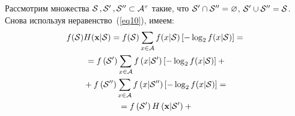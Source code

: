 \begin{multicols}{2}
Рассмотрим множества ${\cal S}\,,{\cal S}'\,,{\cal S}''\subset{\cal A}^\tau$ такие, 
что ${\cal S}'\cap{\cal S}''\hm =\varnothing$, ${\cal S}'\cup{\cal S}'' \hm={\cal S}$. 
Снова используя неравенство~(\ref{eq10}), имеем:
\begin{multline*}
f({\cal S}) H(\mathbf{x}|{\cal S}) =
f({\cal S})\sum\limits_{x\in{\cal A}} f(x|{\cal S}) 
\left[-\log_{2}f(x|{\cal S})\right] ={} \\
{}= f\left( {\cal S}'\right)\sum\limits_{x\in{\cal A}} f\left(x|{\cal S}'\right) 
\left[-\log_{2}f(x|{\cal S})\right] +{}\\
{}+
f\left({\cal S}''\right)\sum\limits_{x\in{\cal A}} f\left(x|{\cal S}''\right) 
\left[-\log_{2}f(x|{\cal S})\right] ={} \\
{}= f\left({\cal S}'\right) H\left(\mathbf{x}|{\cal S}'\right) +{}
\end{multline*}


\end{multicols}

